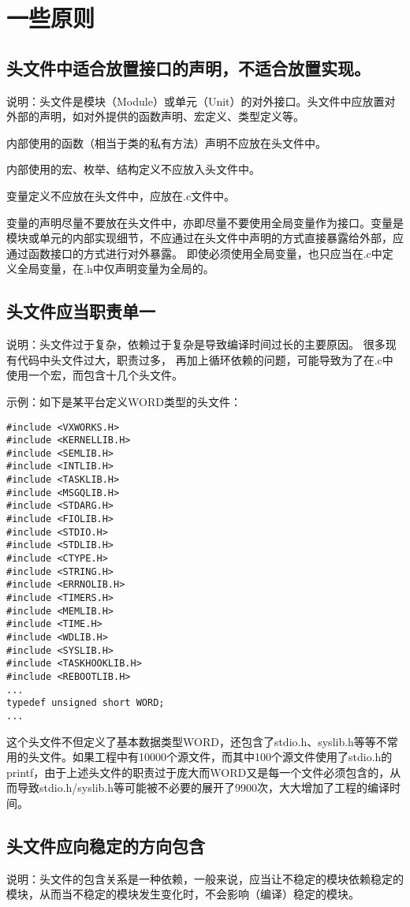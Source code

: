 \section{一些原则}


\subsection{头文件中适合放置接口的声明，不适合放置实现。}
说明：头文件是模块（Module）或单元（Unit）的对外接口。头文件中应放置对外部的声明，如对外提供的函数声明、宏定义、类型定义等。

内部使用的函数（相当于类的私有方法）声明不应放在头文件中。

内部使用的宏、枚举、结构定义不应放入头文件中。

变量定义不应放在头文件中，应放在.c文件中。

变量的声明尽量不要放在头文件中，亦即尽量不要使用全局变量作为接口。变量是模块或单元的内部实现细节，不应通过在头文件中声明的方式直接暴露给外部，应通过函数接口的方式进行对外暴露。 即使必须使用全局变量，也只应当在.c中定义全局变量，在.h中仅声明变量为全局的。


\subsection{头文件应当职责单一}
说明：头文件过于复杂，依赖过于复杂是导致编译时间过长的主要原因。 很多现有代码中头文件过大，职责过多， 再加上循环依赖的问题，可能导致为了在.c中使用一个宏，而包含十几个头文件。

示例：如下是某平台定义WORD类型的头文件：
\begin{verbatim}
#include <VXWORKS.H>
#include <KERNELLIB.H>
#include <SEMLIB.H>
#include <INTLIB.H>
#include <TASKLIB.H>
#include <MSGQLIB.H>
#include <STDARG.H>
#include <FIOLIB.H>
#include <STDIO.H>
#include <STDLIB.H>
#include <CTYPE.H>
#include <STRING.H>
#include <ERRNOLIB.H>
#include <TIMERS.H>
#include <MEMLIB.H>
#include <TIME.H>
#include <WDLIB.H>
#include <SYSLIB.H>
#include <TASKHOOKLIB.H>
#include <REBOOTLIB.H>
...
typedef unsigned short WORD;
...
\end{verbatim}
这个头文件不但定义了基本数据类型WORD，还包含了stdio.h、syslib.h等等不常用的头文件。如果工程中有10000个源文件，而其中100个源文件使用了stdio.h的printf，由于上述头文件的职责过于庞大而WORD又是每一个文件必须包含的，从而导致stdio.h/syslib.h等可能被不必要的展开了9900次，大大增加了工程的编译时间。


\subsection{头文件应向稳定的方向包含}
说明：头文件的包含关系是一种依赖，一般来说，应当让不稳定的模块依赖稳定的模块，从而当不稳定的模块发生变化时，不会影响（编译）稳定的模块。

